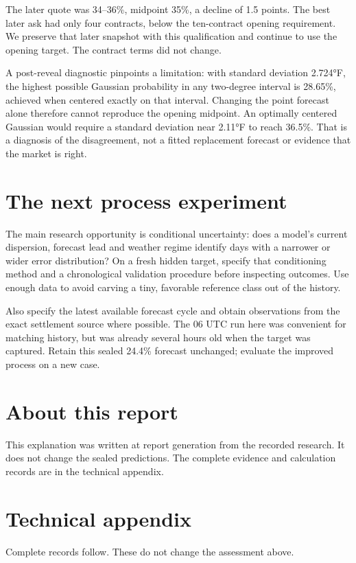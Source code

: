 \documentclass[11pt]{article}
\begin{document}
The later quote was 34–36\%, midpoint 35\%, a decline of 1.5 points. The best later ask had only four contracts, below the ten-contract opening requirement. We preserve that later snapshot with this qualification and continue to use the opening target. The contract terms did not change.


A post-reveal diagnostic pinpoints a limitation: with standard deviation 2.724°F, the highest possible Gaussian probability in any two-degree interval is 28.65\%, achieved when centered exactly on that interval. Changing the point forecast alone therefore cannot reproduce the opening midpoint. An optimally centered Gaussian would require a standard deviation near 2.11°F to reach 36.5\%. That is a diagnosis of the disagreement, not a fitted replacement forecast or evidence that the market is right.


\section*{\textcolor{epdarkgreen}{The next process experiment}}
The main research opportunity is conditional uncertainty: does a model’s current dispersion, forecast lead and weather regime identify days with a narrower or wider error distribution? On a fresh hidden target, specify that conditioning method and a chronological validation procedure before inspecting outcomes. Use enough data to avoid carving a tiny, favorable reference class out of the history.


Also specify the latest available forecast cycle and obtain observations from the exact settlement source where possible. The 06 UTC run here was convenient for matching history, but was already several hours old when the target was captured. Retain this sealed 24.4\% forecast unchanged; evaluate the improved process on a new case.


\section*{\textcolor{epdarkgreen}{About this report}}
This explanation was written at report generation from the recorded research. It does not change the sealed predictions. The complete evidence and calculation records are in the technical appendix.


\clearpage
\appendix
\section{Technical appendix}
Complete records follow. These do not change the assessment above.
\end{document}
